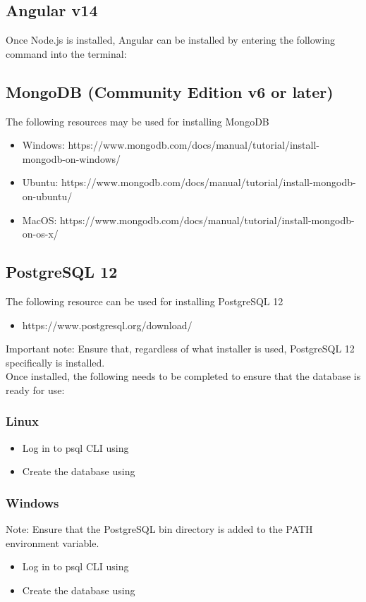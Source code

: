 \documentclass[12pt]{article}
\begin{document}
\subsection{Angular v14}
Once Node.js is installed, Angular can be installed by entering the following command into the terminal:\\

\subsection{MongoDB (Community Edition v6 or later)}
The following resources may be used for installing MongoDB
\begin{itemize}
    \item Windows: https://www.mongodb.com/docs/manual/tutorial/install-mongodb-on-windows/
    \item Ubuntu: https://www.mongodb.com/docs/manual/tutorial/install-mongodb-on-ubuntu/
    \item MacOS: https://www.mongodb.com/docs/manual/tutorial/install-mongodb-on-os-x/
\end{itemize}

\subsection{PostgreSQL 12}
The following resource can be used for installing PostgreSQL 12
\begin{itemize}
    \item https://www.postgresql.org/download/
\end{itemize}
Important note: Ensure that, regardless of what installer is used, PostgreSQL 12 specifically is installed.\\
Once installed, the following needs to be completed to ensure that the database is ready for use:
\subsubsection*{Linux}
\begin{itemize}
    \item Log in to psql CLI using 
    \item Create the database using 
\end{itemize}

\subsubsection*{Windows}
Note: Ensure that the PostgreSQL bin directory is added to the PATH environment variable.\\
\begin{itemize}
    \item Log in to psql CLI using 
    \item Create the database using 
\end{itemize}
\end{document}
